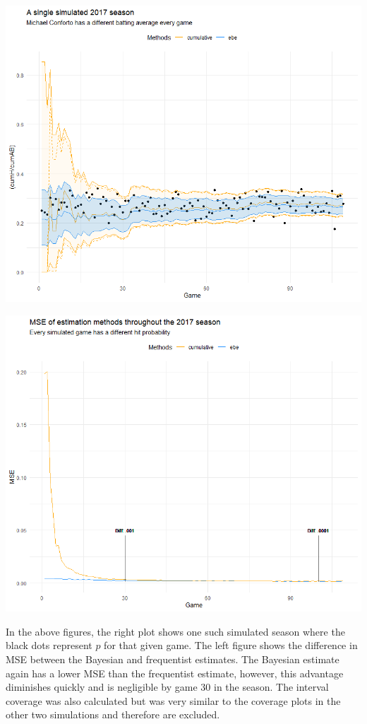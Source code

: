 \documentclass[10pt,a4paper]{article}
\begin{document}
\begin{minipage}{.5\textwidth}
	\includegraphics[width=.95\textwidth]{manyp_2017}
\end{minipage}
\begin{minipage}{.5\textwidth}
	\includegraphics[width=.95\textwidth]{manyp_mse}
\end{minipage}

In the above figures, the right plot shows one such simulated season where the black dots represent $p$ for that given game.
The left figure shows the difference in MSE between the Bayesian and frequentist estimates.
The Bayesian estimate again has a lower MSE than the frequentist estimate, however, this advantage diminishes quickly and is negligible by game 30 in the season.
The interval coverage was also calculated but was very similar to the coverage plots in the other two simulations and therefore are excluded.
\end{document}
